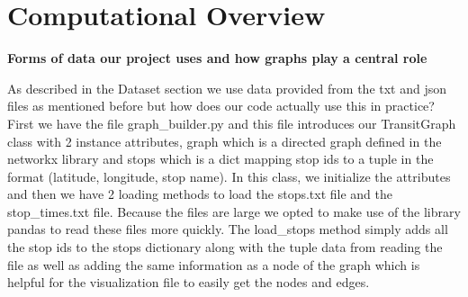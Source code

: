 \documentclass[fontsize=11pt]{article}
\begin{document}



\section*{Computational Overview}

\vspace{1em}

\textbf{Forms of data our project uses and how graphs play a central role}

\vspace{1em}

As described in the Dataset section we use data provided from the txt and json files as mentioned before but how does our code actually use this in practice? First we have the file graph\_builder.py and this file introduces our TransitGraph class with 2 instance attributes, graph which is a directed graph defined in the networkx library and stops which is a dict mapping stop ids to a tuple in the format (latitude, longitude, stop name). In this class, we initialize the attributes and then we have 2 loading methods to load the stops.txt file and the stop\_times.txt file. Because the files are large we opted to make use of the library pandas to read these files more quickly. The load\_stops method simply adds all the stop ids to the stops dictionary along with the tuple data from reading the file as well as adding the same information as a node of the graph which is helpful for the visualization file to easily get the nodes and edges.

\vspace{1em}
\end{document}
